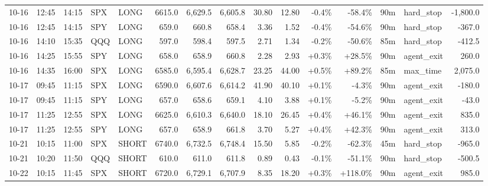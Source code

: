 \documentclass[11pt,a4paper,twoside]{article}
\begin{document}
\begin{landscape}
\begin{center}
\begin{longtable}{>{\color{txtmain}}l l l l l r r r r r r r r >{\color{txtmain}}l r}
10-16 & 12:45 & 14:15 & SPX & LONG & 6615.0 & 6,629.5 & 6,605.8 & 30.80 & 12.80 & \textcolor{lossred}{-0.4\%} & \textcolor{lossred}{-58.4\%} & 90m & hard\_stop & \textcolor{lossred}{-1,800.0} \\
10-16 & 12:45 & 14:15 & SPY & LONG & 659.0 & 660.8 & 658.4 & 3.36 & 1.52 & \textcolor{lossred}{-0.4\%} & \textcolor{lossred}{-54.6\%} & 90m & hard\_stop & \textcolor{lossred}{-367.0} \\
10-16 & 14:10 & 15:35 & QQQ & LONG & 597.0 & 598.4 & 597.5 & 2.71 & 1.34 & \textcolor{lossred}{-0.2\%} & \textcolor{lossred}{-50.6\%} & 85m & hard\_stop & \textcolor{lossred}{-412.5} \\
10-16 & 14:25 & 15:55 & SPY & LONG & 658.0 & 658.9 & 660.8 & 2.28 & 2.93 & \textcolor{wingreen}{+0.3\%} & \textcolor{wingreen}{+28.5\%} & 90m & agent\_exit & \textcolor{wingreen}{260.0} \\
10-16 & 14:35 & 16:00 & SPX & LONG & 6585.0 & 6,595.4 & 6,628.7 & 23.25 & 44.00 & \textcolor{wingreen}{+0.5\%} & \textcolor{wingreen}{+89.2\%} & 85m & max\_time & \textcolor{wingreen}{2,075.0} \\
10-17 & 09:45 & 11:15 & SPX & LONG & 6590.0 & 6,607.6 & 6,614.2 & 41.90 & 40.10 & \textcolor{wingreen}{+0.1\%} & \textcolor{lossred}{-4.3\%} & 90m & agent\_exit & \textcolor{lossred}{-180.0} \\
10-17 & 09:45 & 11:15 & SPY & LONG & 657.0 & 658.6 & 659.1 & 4.10 & 3.88 & \textcolor{wingreen}{+0.1\%} & \textcolor{lossred}{-5.2\%} & 90m & agent\_exit & \textcolor{lossred}{-43.0} \\
10-17 & 11:25 & 12:55 & SPX & LONG & 6625.0 & 6,610.3 & 6,640.0 & 18.10 & 26.45 & \textcolor{wingreen}{+0.4\%} & \textcolor{wingreen}{+46.1\%} & 90m & agent\_exit & \textcolor{wingreen}{835.0} \\
10-17 & 11:25 & 12:55 & SPY & LONG & 657.0 & 658.9 & 661.8 & 3.70 & 5.27 & \textcolor{wingreen}{+0.4\%} & \textcolor{wingreen}{+42.3\%} & 90m & agent\_exit & \textcolor{wingreen}{313.0} \\
10-21 & 10:15 & 11:00 & SPX & SHORT & 6740.0 & 6,732.5 & 6,748.4 & 15.50 & 5.85 & \textcolor{lossred}{-0.2\%} & \textcolor{lossred}{-62.3\%} & 45m & hard\_stop & \textcolor{lossred}{-965.0} \\
10-21 & 10:20 & 11:50 & QQQ & SHORT & 610.0 & 611.0 & 611.8 & 0.89 & 0.43 & \textcolor{lossred}{-0.1\%} & \textcolor{lossred}{-51.1\%} & 90m & hard\_stop & \textcolor{lossred}{-500.5} \\
10-22 & 10:15 & 11:45 & SPX & SHORT & 6720.0 & 6,729.1 & 6,707.9 & 8.35 & 18.20 & \textcolor{wingreen}{+0.3\%} & \textcolor{wingreen}{+118.0\%} & 90m & agent\_exit & \textcolor{wingreen}{985.0} \\

\end{longtable}
\end{center}
\end{landscape}
\end{document}
